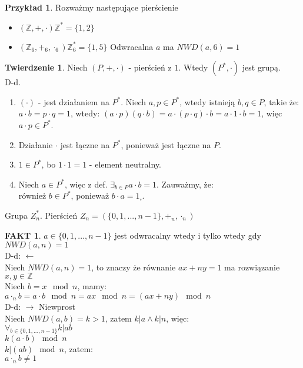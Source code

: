 \documentclass{article}
\theoremstyle{definition}
\theoremstyle{definition}
\newtheorem{tw}{Twierdzenie}[subsection]
\theoremstyle{definition}
\newtheorem{pk}{Przykład}[subsection]
\theoremstyle{definition}
\newtheorem*{fakt}{FAKT}
\begin{document}
\begin{pk}
    Rozważmy następujące pierścienie
    \begin{itemize}
        \item $(\mathbb{Z,+,\cdot}) \mathbb{Z}^*=\{1,2\}$
        \item $(\mathbb{Z}_{6}, +_{6}, \cdot_{6}) \mathbb{Z}_6^*=\{1,5\}$ Odwracalna $a$ ma $NWD(a,6)=1$
    \end{itemize}
\end{pk}

\begin{tw}
    Niech $(P, +, \cdot)$ - pierścień z $1$. Wtedy $(P^*, \cdot)$ jest grupą.\\
    D-d. 
    \begin{enumerate}
        \item $(\cdot)$ - jest działaniem na $P^*$. 
        Niech $a,p\in P^*$, wtedy istnieją $b, q\in P$, takie że:
        $a\cdot b = p\cdot q = 1$, wtedy:
        $(a\cdot p)(q\cdot b) = a \cdot (p \cdot q) \cdot b = a \cdot 1 \cdot b = 1$,
        więc $a\cdot p \in P^*$.
        \item Działanie $\cdot$ jest łączne na $P^*$, ponieważ jest łączne na $P$.
        \item $1\in P^*$, bo $1\cdot 1 = 1$ - element neutralny.
        \item Niech $a\in P^*$, więc z def. $\exists_{b \in P} a\cdot b = 1$. Zauważmy, że:\\
        również $b\in P^*$, ponieważ $b\cdot a = 1_{\square}$.
    \end{enumerate}
\end{tw}

Grupa $Z_n^*$. Pierścień $Z_n = (\{0,1,...,n-1\},+_n, \cdot_n)$

\begin{fakt}
    $a\in\{0,1,...,n-1\}$ jest odwracalny wtedy i tylko wtedy gdy $NWD(a,n)=1$\\
    D-d: $\leftarrow$\\
    Niech $NWD(a,n)=1$, to znaczy że równanie $ax+ny=1$ ma rozwiązanie $x,y\in\mathbb{Z}$\\
    Niech $b=x\mod n$, mamy:\\
    $a\cdot_n b = a\cdot b \mod n = ax\mod n= (ax+ny)\mod n$\\
    D-d: $\rightarrow$ Niewprost\\
    Niech $NWD(a,b)=k > 1$, zatem $k|a \land k|n$, więc:\\
    $\forall_{b\in\{0,1,...,n-1\}} k|ab$\\
    $k(a\cdot b) \mod n$\\
    $k | (ab) \mod n$, zatem:\\
    $a\cdot_n b \neq 1$
\end{fakt}
\end{document}

